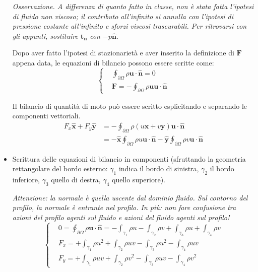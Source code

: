 \begin{itemize}
\textit{Osservazione. A differenza di quanto fatto in classe, non
è stata fatta l'ipotesi di fluido non viscoso; il contributo 
all'infinito si annulla con l'ipotesi di pressione costante 
all'infinito e sforzi viscosi trascurabili. Per ritrovarsi con gli appunti, sostituire $\bm{t_n}$ con
$-p\bm{\hat{n}}$}.

Dopo aver fatto l'ipotesi di stazionarietà e aver inserito la definizione di $\bm{F}$ appena data, le equazioni di bilancio possono essere scritte come:
    \begin{equation}
      \begin{cases}
      & \oint_{\partial \Omega} \rho \bm{u} \cdot \hat{\bm{n}} = 0  \\
      & \bm{F} = - \oint_{\partial \Omega} \rho \bm{u} \bm{u} \cdot \hat{\bm{n}} 
      \end{cases}
    \label{eqn:airfoil_bil_int}
    \end{equation}

Il bilancio di quantità di moto può essere scritto esplicitando e
separando le componenti vettoriali.
    \begin{equation}
    \begin{aligned}
       F_x\bm{\hat{x}} + F_y\bm{\hat{y}} 
& = - \oint_{\partial \Omega} \rho (u \bm{x} + v \bm{y}) \bm{u} \cdot \hat{\bm{n}} \\
& =       - \bm{\hat{x}} \oint_{\partial \Omega} \rho u \bm{u} \cdot \hat{\bm{n}} -  \bm{\hat{y}} \oint_{\partial \Omega} \rho v  \bm{u} \cdot \hat{\bm{n}}
    \end{aligned}
    \end{equation}
\item Scrittura delle equazioni di bilancio in componenti (sfruttando la geometria rettangolare del bordo esterno: $\gamma_1$ indica il bordo di sinistra, $\gamma_2$ il bordo inferiore, $\gamma_3$ quello di destra, $\gamma_4$ quello superiore).

\textit{Attenzione: la normale è quella uscente dal dominio fluido. Sul contorno del profilo, la
normale è entrante nel profilo. 
In più: non fare confusione tra azioni del profilo agenti sul fluido e azioni del fluido agenti 
sul profilo!}
  \begin{equation}
     \begin{cases}
      & 0 = \oint_{\partial \Omega} \rho \bm{u} \cdot \hat{\bm{n}} = -\int_{\gamma_1} \rho u
      -\int_{\gamma_2} \rho v +\int_{\gamma_3} \rho u +\int_{\gamma_4} \rho v \\
      & F_x = +\int_{\gamma_1} \rho u^2 +\int_{\gamma_2} \rho u v -\int_{\gamma_3} \rho u^2 -\int_{\gamma_4} \rho u v \\
      & F_y = +\int_{\gamma_1} \rho u v +\int_{\gamma_2} \rho v^2 -\int_{\gamma_3} \rho u v -\int_{\gamma_4} \rho v^2
     \end{cases}
  \end{equation}


\end{itemize}
